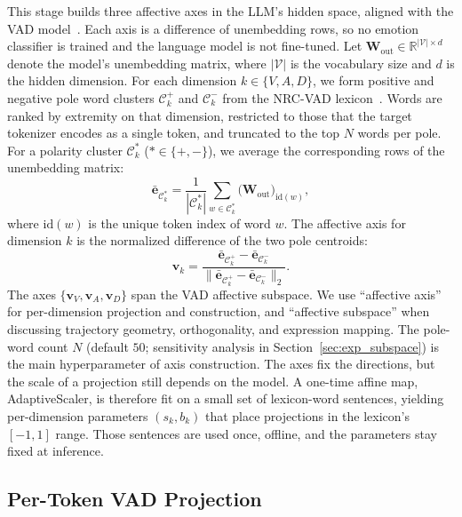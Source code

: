 \documentclass[letterpaper, 10 pt, conference]{ieeeconf/ieeeconf}
\begin{document}
This stage builds three affective axes in the LLM's hidden space, aligned with the VAD model~\cite{russell1977evidence}. Each axis is a difference of unembedding rows, so no emotion classifier is trained and the language model is not fine-tuned.
Let $\mathbf{W}_{\mathrm{out}} \in \mathbb{R}^{|\mathcal{V}| \times d}$ denote the model's unembedding matrix, where $|\mathcal{V}|$ is the vocabulary size and $d$ is the hidden dimension.
For each dimension $k \in \{V, A, D\}$, we form positive and negative pole word clusters $\mathcal{C}^{+}_k$ and $\mathcal{C}^{-}_k$ from the NRC-VAD lexicon~\cite{mohammad2018nrcvad}. Words are ranked by extremity on that dimension, restricted to those that the target tokenizer encodes as a single token, and truncated to the top $N$ words per pole.
For a polarity cluster $\mathcal{C}^{*}_k$ ($* \in \{+, -\}$), we average the corresponding rows of the unembedding matrix:
\begin{equation}
    \bar{\mathbf{e}}_{\mathcal{C}^{*}_k} = \frac{1}{|\mathcal{C}^{*}_k|}\sum_{w \in \mathcal{C}^{*}_k} \bigl(\mathbf{W}_{\mathrm{out}}\bigr)_{\mathrm{id}(w)},
\end{equation}
where $\mathrm{id}(w)$ is the unique token index of word $w$.
The affective axis for dimension $k$ is the normalized difference of the two pole centroids:
\begin{equation}
    \mathbf{v}_k = \frac{\bar{\mathbf{e}}_{\mathcal{C}^{+}_k} - \bar{\mathbf{e}}_{\mathcal{C}^{-}_k}}{\bigl\|\bar{\mathbf{e}}_{\mathcal{C}^{+}_k} - \bar{\mathbf{e}}_{\mathcal{C}^{-}_k}\bigr\|_2}.
    \label{eq:valence_axis}
\end{equation}
The axes $\{\mathbf{v}_V, \mathbf{v}_A, \mathbf{v}_D\}$ span the VAD affective subspace. We use ``affective axis'' for per-dimension projection and construction, and ``affective subspace'' when discussing trajectory geometry, orthogonality, and expression mapping.
The pole-word count $N$ (default $50$; sensitivity analysis in Section~\ref{sec:exp_subspace}) is the main hyperparameter of axis construction.
The axes fix the directions, but the scale of a projection still depends on the model. A one-time affine map, AdaptiveScaler, is therefore fit on a small set of lexicon-word sentences, yielding per-dimension parameters $(s_k, b_k)$ that place projections in the lexicon's $[-1, 1]$ range. Those sentences are used once, offline, and the parameters stay fixed at inference.

\subsection{Per-Token VAD Projection}
\label{sec:projection}
\end{document}
